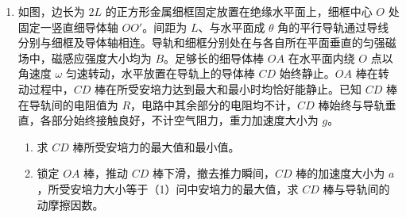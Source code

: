 \documentclass[\gkver]{gaokaozhenti}
\begin{document}
\begin{enumerate}
{（2）在 $A$ 点细线对小球的拉力为 0，根据牛顿第二定律得 $Eq - mg = m\frac{v_{A}^{2}}{L}$

$A$ 到 $B$ 过程根据动能定理得 $qU - mgL = \frac{1}{2}mv_{B}^{2} - \frac{1}{2}mv_{A}^{2}$

联立解得 $v_{A} = \sqrt{\frac{qU - mgL}{m}}$，$v_{B} = \sqrt{\frac{3(qU - mgL)}{m}}$
}

\item
如图，边长为 $2L$ 的正方形金属细框固定放置在绝缘水平面上，细框中心 $O$ 处固定一竖直细导体轴 $OO'$。间距为 $L$、与水平面成 $\theta$ 角的平行导轨通过导线分别与细框及导体轴相连。导轨和细框分别处在与各自所在平面垂直的匀强磁场中，磁感应强度大小均为 $B$。足够长的细导体棒 $OA$ 在水平面内绕 $O$ 点以角速度 $\omega$ 匀速转动，水平放置在导轨上的导体棒 $CD$ 始终静止。$OA$ 棒在转动过程中，$CD$ 棒在所受安培力达到最大和最小时均恰好能静止。已知 $CD$ 棒在导轨间的电阻值为 $R$，电路中其余部分的电阻均不计，$CD$ 棒始终与导轨垂直，各部分始终接触良好，不计空气阻力，重力加速度大小为 $g$。
\begin{enumerate}
	\item
	求 $CD$ 棒所受安培力的最大值和最小值。
	\item
	锁定 $OA$ 棒，推动 $CD$ 棒下滑，撤去推力瞬间，$CD$ 棒的加速度大小为 $a$，所受安培力大小等于（1）问中安培力的最大值，求 $CD$ 棒与导轨间的动摩擦因数。
\end{enumerate}

\end{enumerate}
\end{document}
